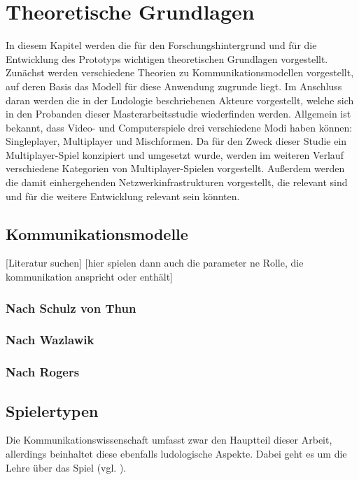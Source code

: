 \chapter{Theoretische Grundlagen}

In diesem Kapitel werden die für den Forschungshintergrund und für die Entwicklung des Prototyps wichtigen theoretischen Grundlagen vorgestellt.
Zunächst werden verschiedene Theorien zu Kommunikationsmodellen vorgestellt, auf deren Basis das Modell für diese Anwendung zugrunde liegt.
Im Anschluss daran werden die in der Ludologie beschriebenen Akteure vorgestellt, welche sich in den Probanden dieser Masterarbeitsstudie wiederfinden werden. Allgemein ist bekannt, dass Video- und Computerspiele drei verschiedene Modi haben können: Singleplayer, Multiplayer und Mischformen. Da für den Zweck dieser Studie ein Multiplayer-Spiel konzipiert und umgesetzt wurde, werden im weiteren Verlauf verschiedene Kategorien von Multiplayer-Spielen vorgestellt. Außerdem werden die damit einhergehenden Netzwerkinfrastrukturen vorgestellt, die relevant sind und für die weitere Entwicklung relevant sein könnten.

\section{Kommunikationsmodelle}
[Literatur suchen]
[hier spielen dann auch die parameter ne Rolle, die kommunikation anspricht oder enthält]
\subsection{Nach Schulz von Thun}
\subsection{Nach Wazlawik}
\subsection{Nach Rogers}


\section{Spielertypen}
Die Kommunikationswissenschaft umfasst zwar den Hauptteil dieser Arbeit, allerdings beinhaltet diese ebenfalls ludologische Aspekte. Dabei geht es um die Lehre über das Spiel (vgl. \cite{ludologie_spielforschung_nodate}). 

